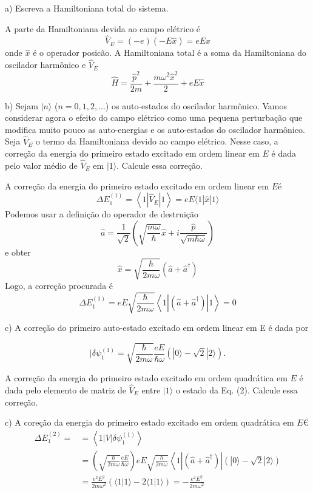 \begin{enumerate}[start=1,label={\bfseries Q\arabic*.}]
a) Escreva a Hamiltoniana total do sistema.

\resposta A parte da Hamiltoniana devida ao campo elétrico é
$$
\hat{V}_{E}=(-e)(-E \hat{x})=e E \hat{x}
$$
onde $\hat{x}$ é o operador posicão. A Hamiltoniana total é a soma da Hamiltoniana do oscilador harmônico e $\hat{V}_{E}$
$$
\hat{H}=\frac{\hat{p}^{2}}{2 m}+\frac{m \omega^{2} \hat{x}^{2}}{2}+e E \hat{x}
$$


b) Sejam $|n\rangle$ ($n = 0,1,2,...$) os auto-estados do oscilador harmônico. Vamos considerar agora o efeito do campo elétrico como uma pequena perturbação que modifica muito pouco as auto-energias e os auto-estados do oscilador harmônico. Seja $\hat{V}_{E}$ o termo da Hamiltoniana devido ao campo elétrico. Nesse caso, a correção da energia do primeiro estado excitado em ordem linear em $E$ é dada pelo valor médio de $\hat{V}_{E}$ em $|1\rangle$. Calcule essa correção.

\resposta A correção da energia do primeiro estado excitado em ordem linear em $E é$
$$
\Delta E_{1}^{(1)}=\left\langle 1\left|\hat{V}_{E}\right| 1\right\rangle=e E\langle 1|\hat{x}| 1\rangle
$$
Podemos usar a definição do operador de destruição
$$
\hat{a}=\frac{1}{\sqrt{2}}\left(\sqrt{\frac{m \omega}{\hbar}} \hat{x}+i \frac{\hat{p}}{\sqrt{m \hbar \omega}}\right)
$$
e obter
$$
\hat{x}=\sqrt{\frac{\hbar}{2 m \omega}}\left(\hat{a}+\hat{a}^{\dagger}\right)
$$
Logo, a correção procurada é
$$
\Delta E_{1}^{(1)}=e E \sqrt{\frac{\hbar}{2 m \omega}}\left\langle 1\left|\left(\hat{a}+\hat{a}^{\dagger}\right)\right| 1\right\rangle=0
$$

c) A correção do primeiro auto-estado excitado em ordem linear em E é dada por

\begin{equation}
 | \delta \psi_{1}^{(1)} = \sqrt{\frac{\hbar}{2m\omega}} \frac{eE}{\hbar\omega} \left( |0\rangle - \sqrt{2} |2\rangle  \right).
\end{equation}

A correção da energia do primeiro estado excitado em ordem quadrática em $E$ é dada pelo elemento de matriz de $\hat{V}_{E}$ entre $|1\rangle$ o estado da Eq. (2). Calcule essa correção.

\resposta c) A coreção da energia do primeiro estado excitado em ordem quadrática em $E €$
$$
\begin{aligned}
\Delta E_{1}^{(2)}=&=\left\langle 1|V| \delta \psi_{1}^{(1)}\right\rangle \\
&=\left(\sqrt{\frac{\hbar}{2 m \omega}} \frac{e E}{\hbar \omega}\right) e E \sqrt{\frac{\hbar}{2 m \omega}}\left\langle 1\left|\left(\hat{a}+\hat{a}^{\dagger}\right)\right|(|0\rangle-\sqrt{2}|2\rangle)\right.\\
&=\frac{e^{2} E^{2}}{2 m \omega^{2}}(\langle 1 | 1\rangle-2\langle 1 | 1\rangle)=-\frac{e^{2} E^{2}}{2 m \omega^{2}}
\end{aligned}
$$



\end{enumerate}
